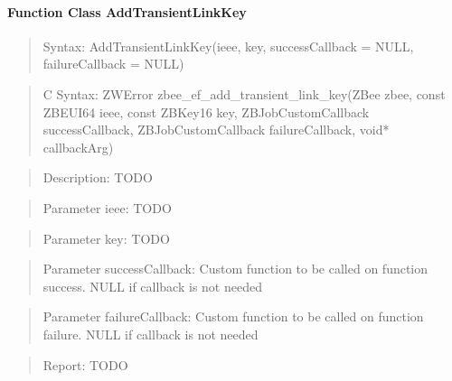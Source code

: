 \paragraph{Function Class AddTransientLinkKey}
\begin{quote}Syntax: AddTransientLinkKey(ieee, key, successCallback = NULL, failureCallback = NULL)\end{quote}
\begin{quote}C Syntax: ZWError zbee\_ef\_add\_transient\_link\_key(ZBee zbee, const ZBEUI64 ieee, const ZBKey16 key, ZBJobCustomCallback successCallback, ZBJobCustomCallback failureCallback, void* callbackArg)\end{quote}
\begin{quote}Description: TODO\end{quote}
\begin{quote}Parameter ieee: TODO\end{quote}
\begin{quote}Parameter key: TODO\end{quote}
\begin{quote}Parameter successCallback: Custom function to be called on function success. NULL if callback is not needed\end{quote}
\begin{quote}Parameter failureCallback: Custom function to be called on function failure. NULL if callback is not needed\end{quote}
\begin{quote}Report: TODO\end{quote}

